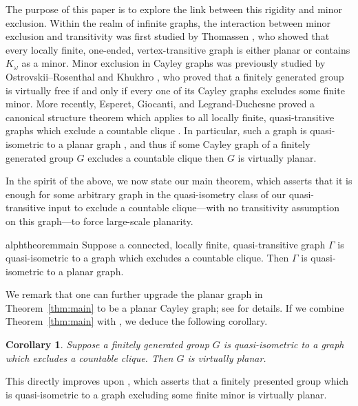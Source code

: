 \documentclass[10pt,a4paper]{amsart}
\newtheorem{alphcor}[alphtheorem]{Corollary}
\theoremstyle{definition}
\begin{document}
The purpose of this paper is to explore the link between this rigidity and minor exclusion. 
Within the realm of infinite graphs, the interaction between minor exclusion and transitivity was first studied by Thomassen \cite{Tho92}, who showed that every locally finite, one-ended, vertex-transitive graph is either planar or contains $K_{\omega}$ as a minor. Minor exclusion in Cayley graphs was previously studied by Ostrovskii–Rosenthal \cite{OR15} and Khukhro \cite{Khu23}, who proved that a finitely generated group is virtually free if and only if every one of its Cayley graphs excludes some finite minor.
More recently, Esperet, Giocanti, and Legrand-Duchesne proved a canonical structure theorem which applies to all locally finite, quasi-transitive graphs which exclude a countable clique \cite{esperet2024structure}. In particular, such a graph is quasi-isometric to a planar graph \cite{Esperet_Giocanti_2024}, and thus if some Cayley graph of a finitely generated group $G$ excludes a countable clique then $G$ is virtually planar. 

In the spirit of the above, we now state our main theorem, which asserts that it is enough for some arbitrary graph in the quasi-isometry class of our quasi-transitive input to exclude a countable clique---with no transitivity assumption on this graph---to force large-scale planarity.


\begin{restatable}{alphtheorem}{main}\label{thm:main}
    Suppose a connected, locally finite, quasi-transitive graph $\Gamma$
    is quasi-isometric to a graph which excludes a countable clique.
    Then $\Gamma$ is quasi-isometric to a planar graph.
\end{restatable}


We remark that one can further upgrade
the planar graph in Theorem~\ref{thm:main} to be a planar Cayley graph;
see \cite{macmanus2024note} for details. 
If we combine Theorem~\ref{thm:main} with
\cite[Cor.~D]{macmanus2023accessibility}, we deduce the following corollary.

\begin{alphcor}\label{cor:planar-rigidity}
    Suppose a finitely generated group $G$ is quasi-isometric to a graph
    which excludes a countable clique. Then $G$ is virtually planar.
\end{alphcor}

This directly improves upon \cite[Cor.~B]{macmanus2025fat}, which asserts that a finitely presented group which is quasi-isometric to a graph excluding some finite minor is virtually planar. 
\end{document}
